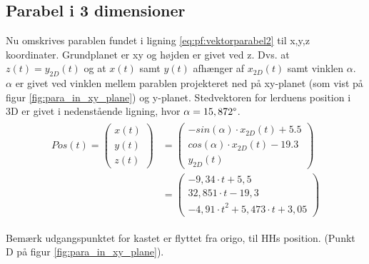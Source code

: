 \subsection{Parabel i 3 dimensioner}
\label{subsubsec:para}
Nu omskrives parablen fundet i ligning \ref{eq:pf:vektorparabel2} til x,y,z koordinater. 
Grundplanet er xy og højden er givet ved z. Dvs. at \(z(t) = y_{2D}(t)\) og at \(x(t)\) samt \(y(t)\) afhænger af \(x_{2D}(t)\) samt vinklen \(\alpha\). 
\(\alpha\) er givet ved vinklen mellem parablen projekteret ned på xy-planet (som vist på figur \ref{fig:para_in_xy_plane}) og y-planet.
Stedvektoren for lerduens position i 3D er givet i nedenstående ligning, hvor \(\alpha = 15,872 \degree\).
\begin{align}
\begin{split}
Pos\left( t \right) = 
\left( \begin{matrix} x\left( t \right)  \\
 y\left( t \right)  \\ 
 z\left( t \right)  \end{matrix} \right) &=
 \left( \begin{matrix} - sin\left( \alpha  \right) \cdot { x }_{ 2D }\left( t \right) + 5.5 \\
 cos\left( \alpha  \right) \cdot { x }_{ 2D }\left( t \right) - 19.3  \\
  { y }_{ 2D }\left( t \right)  \end{matrix} \right)
\\
&= \left( \begin{matrix} - 9,34\cdot t+5,5 \\
  32,851\cdot t-19,3 \\ 
 -{ 4,91\cdot t }^{ 2 }+5,473\cdot t+3,05\end{matrix} \right) 
\label{eq:pf:vektorparabel3d}
\end{split}
\end{align}




Bemærk udgangspunktet for kastet er flyttet fra origo, til HHs position. (Punkt D på figur \ref{fig:para_in_xy_plane}).
